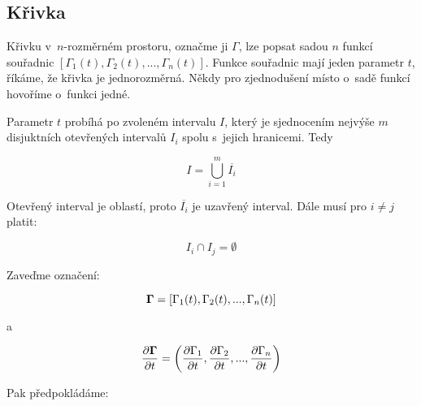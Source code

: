 \subsection{Křivka}

Křivku v~\(n\)-rozměrném prostoru, označme ji \(\Gamma\), lze popsat sadou \(n\) funkcí souřadnic \([\Gamma_1(t), \Gamma_2(t), ..., \Gamma_n(t)]\). Funkce souřadnic mají jeden parametr \(t\), říkáme, že křivka je jednorozměrná. Někdy pro zjednodušení místo o~sadě funkcí hovoříme o~funkci jedné.

Parametr \(t\) probíhá po zvoleném intervalu \(I\), který je sjednocením nejvýše \(m\) disjuktních otevřených intervalů \(I_i\) spolu s~jejich hranicemi. Tedy 

\begin{equation}
I = \bigcup_{i=1}^m \overline{I_i} 
\end{equation}

Otevřený interval je oblastí, proto \(\overline{I_i}\) je uzavřený interval. Dále musí pro \(i \neq j\) platit: 

\begin{equation}
I_i \cap I_j = \emptyset
\end{equation}

Zaveďme označení:

\begin{equation}
\boldsymbol{\Gamma} = [\Gamma_1(t), \Gamma_2(t), ..., \Gamma_n(t)]
\end{equation}

a

\begin{equation}
\frac{\partial \boldsymbol{\Gamma}}{\partial t} = \left(\frac{\partial \Gamma_1}{\partial t}, \frac{\partial \Gamma_2}{\partial t}, ..., \frac{\partial \Gamma_n}{\partial t} \right)
\end{equation}

Pak předpokládáme:

